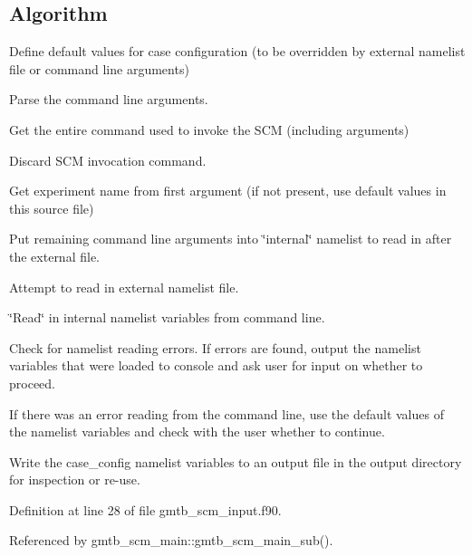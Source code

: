 \hypertarget{group__input_get_config_alg}{}\subsection{Algorithm}\label{group__input_get_config_alg}
Define default values for case configuration (to be overridden by external namelist file or command line arguments)

Parse the command line arguments.


\begin{DoxyItemize}
\item Get the entire command used to invoke the S\+CM (including arguments)
\item Discard S\+CM invocation command.
\item Get experiment name from first argument (if not present, use default values in this source file)
\item Put remaining command line arguments into \char`\"{}internal\char`\"{} namelist to read in after the external file.
\end{DoxyItemize}

Attempt to read in external namelist file.

\char`\"{}\+Read\char`\"{} in internal namelist variables from command line.

Check for namelist reading errors. If errors are found, output the namelist variables that were loaded to console and ask user for input on whether to proceed.

If there was an error reading from the command line, use the default values of the namelist variables and check with the user whether to continue.

Write the case\+\_\+config namelist variables to an output file in the output directory for inspection or re-\/use.

Definition at line 28 of file gmtb\+\_\+scm\+\_\+input.\+f90.



Referenced by gmtb\+\_\+scm\+\_\+main\+::gmtb\+\_\+scm\+\_\+main\+\_\+sub().

